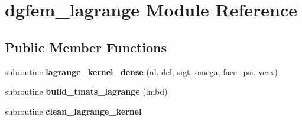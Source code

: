 \hypertarget{classdgfem__lagrange}{\section{dgfem\+\_\+lagrange Module Reference}
\label{classdgfem__lagrange}
}
\subsection*{Public Member Functions}
\begin{DoxyCompactItemize}
\item 
\hypertarget{classdgfem__lagrange_a0b4b6c03d5fe6cff201e83b0a5db5219}{subroutine {\bfseries lagrange\+\_\+kernel\+\_\+dense} (nl, del, sigt, omega, face\+\_\+psi, vecx)}\label{classdgfem__lagrange_a0b4b6c03d5fe6cff201e83b0a5db5219}

\item 
\hypertarget{classdgfem__lagrange_af849c6d2c93fe160b21d315657c33c11}{subroutine {\bfseries build\+\_\+tmats\+\_\+lagrange} (lmbd)}\label{classdgfem__lagrange_af849c6d2c93fe160b21d315657c33c11}

\item 
\hypertarget{classdgfem__lagrange_a57c2ffcc08895d26e6f8f5c5cd621337}{subroutine {\bfseries clean\+\_\+lagrange\+\_\+kernel}}\label{classdgfem__lagrange_a57c2ffcc08895d26e6f8f5c5cd621337}

\end{DoxyCompactItemize}
